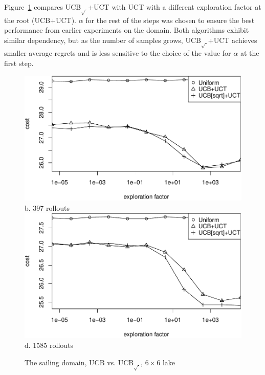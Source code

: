 \documentclass[letterpaper]{article}
\begin{document}
Figure~\ref{fig:sailing-rcq-vs-factor} compares UCB$_{\sqrt{\cdot}}$+UCT with UCT with a
different exploration factor at the root (UCB+UCT). $\alpha$ for the rest of
the steps was chosen to ensure the best performance from earlier
experiments on the domain. Both algorithms exhibit similar dependency,
but as the number of samples grows, UCB$_{\sqrt{\cdot}}$+UCT achieves smaller average
regrets and is less sensitive to the choice of the value for $\alpha$ at
the first step.
\begin{figure}[h!]
  \centering
  \includegraphics[scale=0.45]{rcq-size=6-nsamples=397.pdf}\\
  b. 397 rollouts\\
  \vspace{1em}
  \includegraphics[scale=0.45]{rcq-size=6-nsamples=1585.pdf}\\
  d. 1585 rollouts\\
  \caption{The sailing domain, UCB vs. UCB$_{\sqrt{\cdot}}$, $6\times 6$ lake}
  \label{fig:sailing-rcq-vs-factor}
\end{figure}
\end{document}
